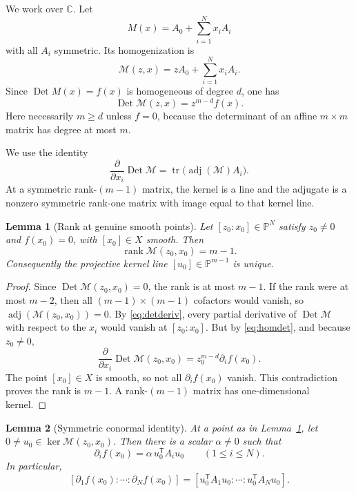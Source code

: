 \documentclass[11pt]{article}
\theoremstyle{plain}
\newtheorem{lemma}{Lemma}
\theoremstyle{definition}
\DeclareMathOperator{\rank}{rank}
\DeclareMathOperator{\adj}{adj}
\DeclareMathOperator{\tr}{tr}
\DeclareMathOperator{\Det}{Det}
\newcommand{\PP}{\mathbb{P}}
\newcommand{\CC}{\mathbb{C}}
\newcommand{\Mcal}{\mathcal M}
\begin{document}
We work over $\CC$.  Let
\[
  M(x)=A_0+\sum_{i=1}^N x_iA_i
\]
with all $A_i$ symmetric.  Its homogenization is
\[
  \Mcal(z,x)=zA_0+\sum_{i=1}^N x_iA_i.
\]
Since $\Det M(x)=f(x)$ is homogeneous of degree $d$, one has
\begin{equation}
\label{eq:homdet}
  \Det\Mcal(z,x)=z^{m-d}f(x).
\end{equation}
Here necessarily $m\ge d$ unless $f=0$, because the determinant of an affine
$m\times m$ matrix has degree at most $m$.

We use the identity
\begin{equation}
\label{eq:detderiv}
  \frac{\partial}{\partial x_i}\Det\Mcal
  =\tr\!\big(\adj(\Mcal)A_i\big).
\end{equation}
At a symmetric rank-$(m-1)$ matrix, the kernel is a line and the adjugate is a
nonzero symmetric rank-one matrix with image equal to that kernel line.

\begin{lemma}[Rank at genuine smooth points]
\label{lem:rank}
Let $[z_0:x_0]\in\PP^N$ satisfy $z_0\ne0$ and $f(x_0)=0$, with
$[x_0]\in X$ smooth.  Then
\[
  \rank\Mcal(z_0,x_0)=m-1.
\]
Consequently the projective kernel line $[u_0]\in\PP^{m-1}$ is unique.
\end{lemma}

\begin{proof}
Since $\Det\Mcal(z_0,x_0)=0$, the rank is at most $m-1$.  If the rank were at
most $m-2$, then all $(m-1)\times(m-1)$ cofactors would vanish, so
$\adj(\Mcal(z_0,x_0))=0$.  By \eqref{eq:detderiv}, every partial derivative of
$\Det\Mcal$ with respect to the $x_i$ would vanish at $[z_0:x_0]$.  But by
\eqref{eq:homdet}, and because $z_0\ne0$,
\[
  \frac{\partial}{\partial x_i}\Det\Mcal(z_0,x_0)
  =z_0^{m-d}\partial_i f(x_0).
\]
The point $[x_0]\in X$ is smooth, so not all $\partial_i f(x_0)$ vanish.  This
contradiction proves the rank is $m-1$.  A rank-$(m-1)$ matrix has one-dimensional
kernel.
\end{proof}

\begin{lemma}[Symmetric conormal identity]
\label{lem:conormal}
At a point as in Lemma~\ref{lem:rank}, let $0\ne u_0\in\ker\Mcal(z_0,x_0)$.  Then
there is a scalar $\alpha\ne0$ such that
\[
  \partial_i f(x_0)=\alpha\,u_0^{\mathsf T}A_i u_0
  \qquad (1\le i\le N).
\]
In particular,
\[
  [\partial_1f(x_0):\cdots:\partial_Nf(x_0)]
  =[u_0^{\mathsf T}A_1u_0:\cdots:u_0^{\mathsf T}A_Nu_0].
\]
\end{lemma}
\end{document}
